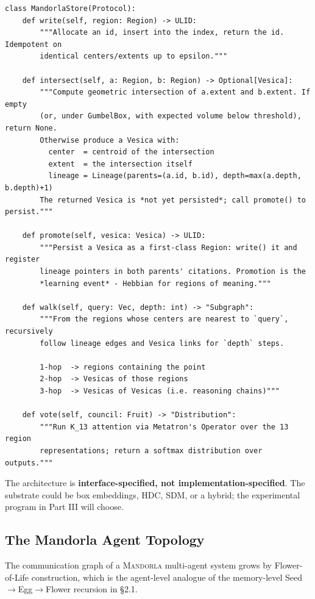 \documentclass[11pt,a4paper]{article}
\begin{document}
\begin{lstlisting}
class MandorlaStore(Protocol):
    def write(self, region: Region) -> ULID:
        """Allocate an id, insert into the index, return the id. Idempotent on
        identical centers/extents up to epsilon."""

    def intersect(self, a: Region, b: Region) -> Optional[Vesica]:
        """Compute geometric intersection of a.extent and b.extent. If empty
        (or, under GumbelBox, with expected volume below threshold), return None.
        Otherwise produce a Vesica with:
          center  = centroid of the intersection
          extent  = the intersection itself
          lineage = Lineage(parents=(a.id, b.id), depth=max(a.depth, b.depth)+1)
        The returned Vesica is *not yet persisted*; call promote() to persist."""

    def promote(self, vesica: Vesica) -> ULID:
        """Persist a Vesica as a first-class Region: write() it and register
        lineage pointers in both parents' citations. Promotion is the
        *learning event* - Hebbian for regions of meaning."""

    def walk(self, query: Vec, depth: int) -> "Subgraph":
        """From the regions whose centers are nearest to `query`, recursively
        follow lineage edges and Vesica links for `depth` steps.

        1-hop  -> regions containing the point
        2-hop  -> Vesicas of those regions
        3-hop  -> Vesicas of Vesicas (i.e. reasoning chains)"""

    def vote(self, council: Fruit) -> "Distribution":
        """Run K_13 attention via Metatron's Operator over the 13 region
        representations; return a softmax distribution over outputs."""
\end{lstlisting}

The architecture is \textbf{interface-specified, not implementation-specified}. The substrate could be box embeddings, HDC, SDM, or a hybrid; the experimental program in Part III will choose.

\subsection{The Mandorla Agent Topology}

The communication graph of a \textsc{Mandorla} multi-agent system grows by Flower-of-Life construction, which is the agent-level analogue of the memory-level Seed$\rightarrow$Egg$\rightarrow$Flower recursion in \S 2.1.
\end{document}
